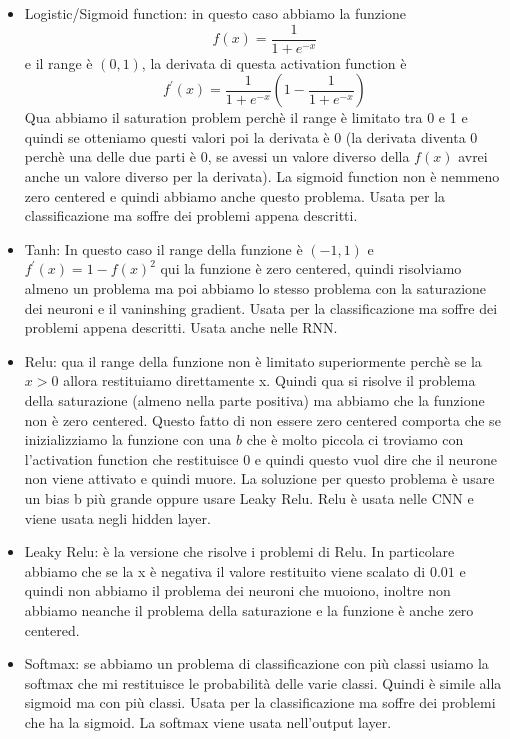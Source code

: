 \documentclass[14pt]{extreport}
\begin{document}
\begin{itemize}
\item Logistic/Sigmoid function: in questo caso abbiamo la funzione $$f(x) = \frac{1}{1+e^{-x}}$$ e il range è $(0,1)$, la derivata di questa 
activation function è $$f^{'}(x) = \frac{1}{1+e^{-x}}(1-\frac{1}{1+e^{-x}})$$
Qua abbiamo il saturation problem perchè il range è limitato tra 0 e 1 e quindi se otteniamo questi valori poi la derivata è 0 (la derivata
diventa 0 perchè una delle due parti è 0, se avessi un valore diverso della $f(x)$ avrei anche un valore diverso per la derivata).
La sigmoid function non è nemmeno zero centered e quindi abbiamo anche questo problema.
Usata per la classificazione ma soffre dei problemi appena descritti.
\item Tanh: In questo caso il range della funzione è $(-1,1)$ e $f^{'}(x) = 1 - f(x)^2$ qui la funzione è zero centered, quindi 
risolviamo almeno un problema ma poi abbiamo lo stesso problema con la saturazione dei neuroni e il vaninshing gradient.
Usata per la classificazione ma soffre dei problemi appena descritti.
Usata anche nelle RNN.
\item Relu: qua il range della funzione non è limitato superiormente perchè se la $x>0$ allora restituiamo direttamente x.
Quindi qua si risolve il problema della saturazione (almeno nella parte positiva) ma abbiamo che la funzione non è zero centered.
Questo fatto di non essere zero centered comporta che se inizializziamo la funzione con una $b$ che è molto piccola ci troviamo con 
l'activation function che restituisce 0 e quindi questo vuol dire che il neurone non viene attivato e quindi muore.
La soluzione per questo problema è usare un bias b più grande oppure usare Leaky Relu.
Relu è usata nelle CNN e viene usata negli hidden layer.
\item Leaky Relu: è la versione che risolve i problemi di Relu. In particolare abbiamo che se la x è negativa il valore restituito
viene scalato di $0.01$ e quindi non abbiamo il problema dei neuroni che muoiono, inoltre non abbiamo neanche il problema 
della saturazione e la funzione è anche zero centered.
\item Softmax: se abbiamo un problema di classificazione con più classi usiamo la softmax che mi restituisce le probabilità delle varie 
classi. Quindi è simile alla sigmoid ma con più classi. Usata per la classificazione ma soffre dei problemi che ha la sigmoid.
La softmax viene usata nell'output layer.
\end{itemize}
\end{document}
